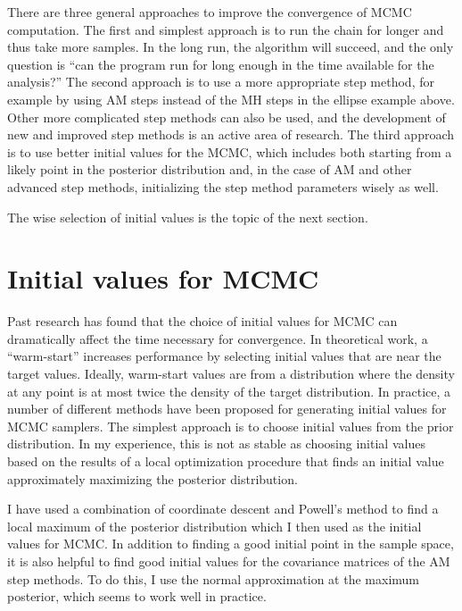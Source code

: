 There are three general approaches to improve the convergence of MCMC
computation. The first and simplest approach is to run the chain for
longer and thus take more samples.  In the long run, the algorithm
will succeed, and the only question is ``can the program run for long
enough in the time available for the analysis?'' The second approach is
to use a more appropriate step method, for example by using AM steps
instead of the MH steps in the ellipse example above.  Other more
complicated step methods can also be used, and the development of new
and improved step methods is an active area of research.  The third
approach is to use better initial values for the MCMC, which includes
both starting from a likely point in the posterior distribution and,
in the case of AM and other advanced step methods, initializing the
step method parameters wisely as well.

The wise selection of initial values is the topic of the next section.

\section{Initial values for MCMC}
Past research has found that the choice of initial values for MCMC can
dramatically affect the time necessary for convergence.  In
theoretical work, a ``warm-start'' increases performance by selecting
initial values that are near the target values.  Ideally, warm-start
values are from a distribution where the density at any point is at most
twice the density of the target distribution. \cite{lovasz_hit_1999,
  kannan_random_1997} In practice, a number of different methods have
been proposed for generating initial values for MCMC
samplers.\cite{gelman_inference_1992,
  frieze_sampling_1993,jennison_discussion_1993,
  brooks_general_1998,brooks_convergence_1998} The simplest approach
is to choose initial values from the prior distribution.  In my
experience, this is not as stable as choosing initial values based on
the results of a local optimization procedure that finds an initial
value approximately maximizing the posterior distribution.

I have used a combination of coordinate descent and Powell's method to
find a local maximum of the posterior distribution which I then used
as the initial values for
MCMC.\cite{tseng_convergence_2001,powell_efficient_1964} In addition to
finding a good initial point in the sample space, it is also helpful
to find good initial values for the covariance matrices of the AM step
methods.  To do this, I use the normal approximation at the maximum
posterior, which seems to work well in practice.



